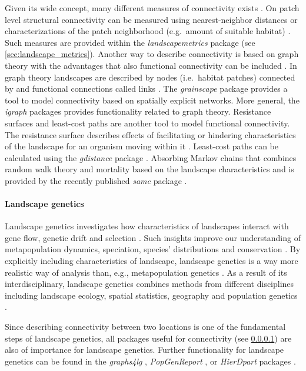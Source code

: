 \documentclass[smallextended]{svjour3}       %
\begin{document}
Given its wide concept, many different measures of connectivity exists \cite{Kindlmann2008}.
On patch level structural connectivity can be measured using nearest-neighbor distances or characterizations of the patch neighborhood (e.g.~amount of suitable habitat) \cite{Kindlmann2008,With2019}.
Such measures are provided within the \emph{landscapemetrics} package (see \ref{sec:landscape_metrics}).
Another way to describe connectivity is based on graph theory with the advantages that also functional connectivity can be included \cite{Kindlmann2008}.
In graph theory \cite{Laita2011} landscapes are described by nodes (i.e.~habitat patches) connected by and functional connections called links \cite{Laita2011}.
The \emph{grainscape} package \cite{Chubaty2020} provides a tool to model connectivity based on spatially explicit networks.
More general, the \emph{igraph} packages \cite{Csardi2006} provides functionality related to graph theory.
Resistance surfaces and least-cost paths are another tool to model functional connectivity.
The resistance surface describes effects of facilitating or hindering characteristics of the landscape for an organism moving within it \cite{Adriaensen2003}.
Least-cost paths can be calculated using the \emph{gdistance} package \cite{vanEtten2017}.
Absorbing Markov chains that combines random walk theory and mortality based on the landscape characteristics \cite{Fletcher2019a} and is provided by the recently published \emph{samc} package \cite{Marx2020}.

\hypertarget{sec:landscape_genetics}{%
\paragraph{Landscape genetics}\label{sec:landscape_genetics}}

Landscape genetics investigates how characteristics of landscapes interact with gene flow, genetic drift and selection \cite{Manel2003}.
Such insights improve our understanding of metapopulation dynamics, speciation, species' distributions and conservation \cite{Storfer2007}.
By explicitly including characteristics of landscape, landscape genetics is a way more realistic way of analysis than, e.g., metapopulation genetics \cite{Holderegger2006}.
As a result of its interdisciplinary, landscape genetics combines methods from different disciplines including landscape ecology, spatial statistics, geography and population genetics \cite{Storfer2007}.

Since describing connectivity between two locations is one of the fundamental steps of landscape genetics, all packages useful for connectivity (see \ref{sec:landscape_genetics}) are also of importance for landscape genetics.
Further functionality for landscape genetics can be found in the \emph{graphs4lg} \cite{Savary2020}, \emph{PopGenReport} \cite{Adamack2014,Gruber2015}, or \emph{HierDpart} packages \cite{Qin2019}.
\end{document}
